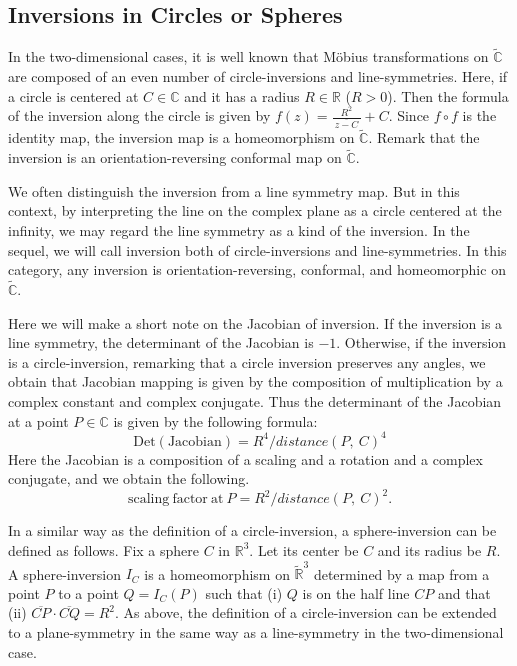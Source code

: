 \subsection{Inversions in Circles or Spheres}

In the two-dimensional cases, it is well known that M\"obius transformations on $\tilde{\mathbb{C}}$
are composed of an even number of circle-inversions and line-symmetries.
Here, if a circle is centered at $C\in\mathbb{C}$ and it has a radius $R\in\mathbb{R}$ ($R>0$).
Then the formula of the inversion along the circle is given by
$f(z) = \frac{R^2}{~\overline{z -C}~} + C$.
Since $f \circ f$ is the identity map, the inversion map is a homeomorphism on $\tilde{\mathbb{C}}$.
Remark that the inversion is an orientation-reversing conformal map on $\tilde{\mathbb{C}}$.

We often distinguish the inversion from a line symmetry map.
But in this context, by interpreting the line on the complex plane as a circle centered at the infinity, 
we may regard the line symmetry as a kind of the inversion. 
In the sequel, we will call inversion both of circle-inversions and line-symmetries.
In this category, any inversion is orientation-reversing, conformal,
and homeomorphic on $\tilde{\mathbb{C}}$.

Here we will make a short note on the Jacobian of inversion.
If the inversion is a line symmetry, the determinant of the Jacobian is $-1$.
Otherwise, if the inversion is a circle-inversion, remarking that a circle inversion
preserves any angles, we obtain that Jacobian mapping is given by the composition of multiplication by a complex constant
and complex conjugate.
Thus the determinant of the Jacobian at a point $P\in\mathbb{C}$ is given by the following formula:
\[ \mathrm{Det}(\mathrm{Jacobian}) = R^4 / distance(P,~C)^4 \]%
Here the Jacobian is a composition of a scaling and a rotation and a complex conjugate, and we obtain the following.
\[ \mathrm{scaling~factor~at~} P  = R^2 / distance(P,~C)^2. \]

In a similar way as the definition of a circle-inversion,
a sphere-inversion can be defined as follows.
Fix a sphere $C$ in $\mathbb{R}^3$.  Let its center be $C$ and its radius be $R$. 
A sphere-inversion $I_C$ is a homeomorphism on $\tilde{\mathbb{R}}^3$ 
determined by a map from a point $P$ to a point $Q = I_C(P)$ such that (i) $Q$ is on the half line $CP$ and 
that (ii) $\overline{CP}\cdot \overline{CQ} = R^2$.
As above, the definition of a circle-inversion can be extended to a plane-symmetry
in the same way as a line-symmetry in the two-dimensional case.

